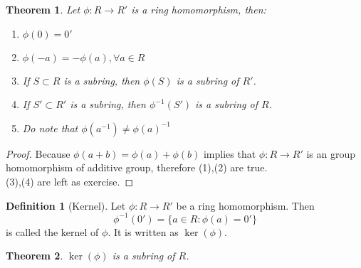 \documentclass{article}
\theoremstyle{MyNonumberplain}
\theoremstyle{break}
\newtheorem*{proof}{Proof. }
\newcommand{\tmmathbf}[1]{\ensuremath{\boldsymbol{#1}}}
\theoremstyle{break}
\newtheorem{theorem}{Theorem}[section]
\theoremstyle{break}
\theoremstyle{definition}
\theoremstyle{break}
\newtheorem{definition}{Definition}[section]
\begin{document}
\begin{thmbox}
    \begin{theorem}
        Let $\phi : R \rightarrow R'$ is a ring homomorphism, then:\\
        \begin{enumerate}
          \item $\phi (0) = 0'$\\
          
          \item $\phi (- a) = - \phi (a), \forall a \in R$\\
          
          \item If $S \subset R$ is a subring, then $\phi (S)$ is a subring of $R'$.\\
          
          \item If $S' \subset R'$ is a subring, then $\phi^{- 1} (S')$ is a subring
          of $R$.\\
          
          \item Do note that $\phi (a^{- 1}) \tmmathbf{\neq} \phi (a)^{- 1}$
        \end{enumerate}
    \end{theorem}
    \begin{prfbox}
        \begin{proof}
            Because $\phi (a + b) = \phi (a) + \phi (b)$ implies that $\phi : R
            \rightarrow R'$ is an group homomorphism of additive group, therefore (1),(2)
            are true.\\
            
            (3),(4) are left as exercise.
        \end{proof}
    \end{prfbox}
\end{thmbox}

\begin{defbox}
    \begin{definition}[Kernel]
        Let $\phi : R \rightarrow R'$ be a ring homomorphism. Then
        \[ \phi^{- 1} (0') = \{ a \in R : \phi (a) = 0' \} \]
        is called the kernel of $\phi$. It is written as $\ker (\phi)$.
    \end{definition}
\end{defbox}

\begin{thmbox}
    \begin{theorem}
        $\ker (\phi)$ is a subring of $R$. 
    \end{theorem}
\end{thmbox}
\end{document}
